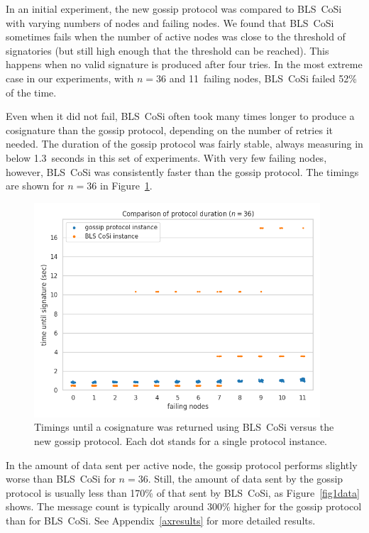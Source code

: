 In an initial experiment, the new gossip protocol was compared to BLS~CoSi with varying numbers of nodes and failing nodes.
We found that BLS~CoSi sometimes fails when the number of active nodes was close to the threshold of signatories (but still high enough that the threshold can be reached).
This happens when no valid signature is produced after four tries.
In the most extreme case in our experiments, with $n = 36$ and 11~failing nodes, BLS~CoSi failed 52\% of the time.

Even when it did not fail, BLS~CoSi often took many times longer to produce a cosignature than the gossip protocol, depending on the number of retries it needed.
The duration of the gossip protocol was fairly stable, always measuring in below 1.3~seconds in this set of experiments.
With very few failing nodes, however, BLS~CoSi was consistently faster than the gossip protocol.
The timings are shown for $n = 36$ in Figure~\ref{fig1time}.

\begin{figure}[!htbp]
    \centering
    \includegraphics[width=0.95\textwidth]{figures/1/round_wall_sum_36_big.png}
    \caption{Timings until a cosignature was returned using BLS~CoSi versus the new gossip protocol. Each dot stands for a single protocol instance.}
    \label{fig1time}
\end{figure}

In the amount of data sent per active node, the gossip protocol performs slightly worse than BLS~CoSi for $n = 36$.
Still, the amount of data sent by the gossip protocol is usually less than 170\% of that sent by BLS~CoSi, as Figure~\ref{fig1data} shows.
The message count is typically around 300\% higher for the gossip protocol than for BLS~CoSi.
See Appendix~\ref{axresults} for more detailed results.

